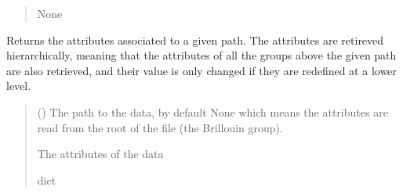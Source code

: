 \documentclass[letterpaper,10pt,english]{sphinxmanual}
\begin{document}
\begin{fulllineitems}
\begin{fulllineitems}
\begin{quote}
\begin{description}
\sphinxAtStartPar
None

\end{description}\end{quote}

\end{fulllineitems}


\begin{fulllineitems}
\label{\detokenize{_autosummary/HDF5_BLS.wrapper:HDF5_BLS.wrapper.Wrapper.get_attributes}}
\pysigstartsignatures
\pysiglinewithargsret
{}
{}
{}
\pysigstopsignatures
\sphinxAtStartPar
Returns the attributes associated to a given path. The attributes are retireved hierarchically, meaning that the attributes of all the groups above the given path are also retrieved, and their value is only changed if they are redefined at a lower level.
\begin{quote}\begin{description}
\sphinxAtStartPar
{} (\sphinxstyleliteralemphasis{\sphinxupquote{, }}) \textendash{} The path to the data, by default None which means the attributes are read from the root of the file (the Brillouin group).

\sphinxAtStartPar
{} \textendash{} The attributes of the data

\sphinxAtStartPar
dict

\end{description}\end{quote}

\end{fulllineitems}



\end{fulllineitems}
\end{document}
